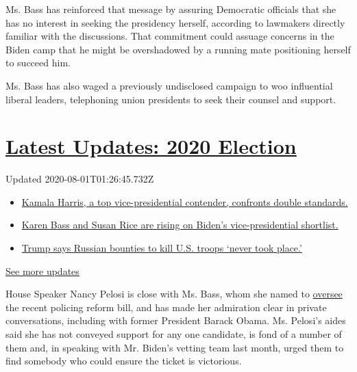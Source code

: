 Ms. Bass has reinforced that message by assuring Democratic officials
that she has no interest in seeking the presidency herself, according to
lawmakers directly familiar with the discussions. That commitment could
assuage concerns in the Biden camp that he might be overshadowed by a
running mate positioning herself to succeed him.

Ms. Bass has also waged a previously undisclosed campaign to woo
influential liberal leaders, telephoning union presidents to seek their
counsel and support.

\hypertarget{latest-updates-2020-election}{%
\section{\texorpdfstring{\href{https://www.nytimes.com/2020/07/31/us/elections/biden-vs-trump.html?action=click\&pgtype=Article\&state=default\&region=MAIN_CONTENT_1\&context=storylines_live_updates}{Latest
Updates: 2020
Election}}{Latest Updates: 2020 Election}}\label{latest-updates-2020-election}}

Updated 2020-08-01T01:26:45.732Z

\begin{itemize}
\tightlist
\item
  \href{https://www.nytimes.com/2020/07/31/us/elections/biden-vs-trump.html?action=click\&pgtype=Article\&state=default\&region=MAIN_CONTENT_1\&context=storylines_live_updates\#link-29fdff45}{Kamala
  Harris, a top vice-presidential contender, confronts double
  standards.}
\item
  \href{https://www.nytimes.com/2020/07/31/us/elections/biden-vs-trump.html?action=click\&pgtype=Article\&state=default\&region=MAIN_CONTENT_1\&context=storylines_live_updates\#link-13ec3d9c}{Karen
  Bass and Susan Rice are rising on Biden's vice-presidential
  shortlist.}
\item
  \href{https://www.nytimes.com/2020/07/31/us/elections/biden-vs-trump.html?action=click\&pgtype=Article\&state=default\&region=MAIN_CONTENT_1\&context=storylines_live_updates\#link-49e9a016}{Trump
  says Russian bounties to kill U.S. troops `never took place.'}
\end{itemize}

\href{https://www.nytimes.com/2020/07/31/us/elections/biden-vs-trump.html?action=click\&pgtype=Article\&state=default\&region=MAIN_CONTENT_1\&context=storylines_live_updates}{See
more updates}

House Speaker Nancy Pelosi is close with Ms. Bass, whom she named to
\href{https://www.nytimes.com/2020/06/10/us/politics/karen-bass.html}{oversee}
the recent policing reform bill, and has made her admiration clear in
private conversations, including with former President Barack Obama. Ms.
Pelosi's aides said she has not conveyed support for any one candidate,
is fond of a number of them and, in speaking with Mr. Biden's vetting
team last month, urged them to find somebody who could ensure the ticket
is victorious.


